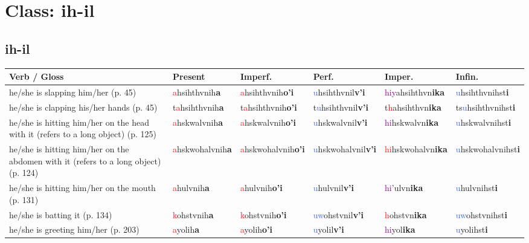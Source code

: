 \documentclass[oneside,openany]{book}%
\begin{document}
\section*{Class: ih-il}%
%
\needspace{1in}%
\subsection*{ih-il}%
\begin{tabularx}{\textwidth}{>{\hsize=1.5\hsize\RaggedRight}X >{\hsize=0.9\hsize}X >{\hsize=0.9\hsize}X >{\hsize=0.9\hsize}X >{\hsize=0.9\hsize}X >{\hsize=0.9\hsize}X}%
\toprule%
\textbf{Verb / Gloss}&\textbf{Present}&\textbf{Imperf.}&\textbf{Perf.}&\textbf{Imper.}&\textbf{Infin.}\\%
\midrule%
he/she is slapping him/her (p. 45)&\textcolor{Red}{a}hsihthvnih\textbf{a}&\textcolor{Red}{a}hsihthvnih\textbf{o'i}&\textcolor{RoyalBlue}{u}hsihthvnil\textbf{v'i}&\textcolor{Purple}{hiy}ahsihthvn\textbf{ika}&\textcolor{RoyalBlue}{u}hsihthvnihst\textbf{i}\\%
he/she is clapping his/her hands (p. 45)&t\textcolor{Red}{a}hsihthvnih\textbf{a}&t\textcolor{Red}{a}hsihthvnih\textbf{o'i}&t\textcolor{RoyalBlue}{u}hsihthvnil\textbf{v'i}&t\textcolor{Red}{h}ahsihthvn\textbf{ika}&ts\textcolor{RoyalBlue}{u}hsihthvnihst\textbf{i}\\%
he/she is hitting him/her on the head with it (refers to a long object) (p. 125)&\textcolor{Red}{a}hskwalvnih\textbf{a}&\textcolor{Red}{a}hskwalvnih\textbf{o'i}&\textcolor{RoyalBlue}{u}hskwalvnil\textbf{v'i}&\textcolor{Purple}{hi}hskwalvn\textbf{ika}&\textcolor{RoyalBlue}{u}hskwalvnihst\textbf{i}\\%
he/she is hitting him/her on the abdomen with it (refers to a long object) (p. 124)&\textcolor{Red}{a}hskwohalvnih\textbf{a}&\textcolor{Red}{a}hskwohalvnih\textbf{o'i}&\textcolor{RoyalBlue}{u}hskwohalvnil\textbf{v'i}&\textcolor{Red}{hi}hskwohalvn\textbf{ika}&\textcolor{RoyalBlue}{u}hskwohalvnihst\textbf{i}\\%
he/she is hitting him/her on the mouth (p. 131)&\textcolor{Red}{a}hulvnih\textbf{a}&\textcolor{Red}{a}hulvnih\textbf{o'i}&\textcolor{RoyalBlue}{u}hulvnil\textbf{v'i}&\textcolor{Purple}{hi}'ulvn\textbf{ika}&\textcolor{RoyalBlue}{u}hulvnihst\textbf{i}\\%
he/she is batting it (p. 134)&\textcolor{Red}{k}ohstvnih\textbf{a}&\textcolor{Red}{k}ohstvnih\textbf{o'i}&\textcolor{RoyalBlue}{uw}ohstvnil\textbf{v'i}&\textcolor{Red}{h}ohstvn\textbf{ika}&\textcolor{RoyalBlue}{uw}ohstvnihst\textbf{i}\\%
he/she is greeting him/her (p. 203)&\textcolor{Red}{a}yolih\textbf{a}&\textcolor{Red}{a}yolih\textbf{o'i}&\textcolor{RoyalBlue}{u}yolil\textbf{v'i}&\textcolor{Purple}{hi}yol\textbf{ika}&\textcolor{RoyalBlue}{u}yolihst\textbf{i}\\%
\bottomrule%
\end{tabularx}%
\vspace{1em}%
\needspace{3in}%
\end{document}
